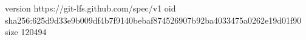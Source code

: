 version https://git-lfs.github.com/spec/v1
oid sha256:625d9d33e9b009df4b7f9140bebaf874526907b92ba4033475a0262e19d01f90
size 120494
